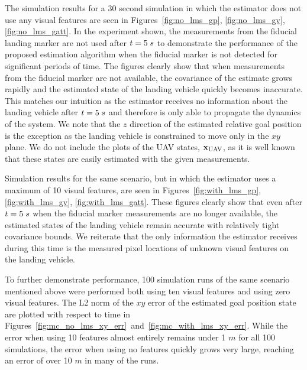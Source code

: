 The simulation results for a 30 second simulation in which the estimator does
not use any visual features are seen in
Figures~\ref{fig:no_lms_gp}, \ref{fig:no_lms_gv}, \ref{fig:no_lms_gatt}. In the
experiment shown, the measurements from the fiducial landing marker are not used
after $t = 5 \hphantom{\cdot} s$ to demonstrate the performance of the proposed
estimation algorithm when the fiducial marker is not detected for significant
periods of time. The figures clearly show that when measurements from the
fiducial marker are not available, the covariance of the estimate grows rapidly
and the estimated state of the landing vehicle quickly becomes inaccurate. This
matches our intuition as the estimator receives no information about the landing
vehicle after $t = 5 \hphantom{\cdot} s$ and therefore is only able to propagate
the dynamics of the system. We note that the $z$ direction of the estimated
relative goal position is the exception as the landing vehicle is constrained to
move only in the $xy$ plane. We do not include the plots of the UAV states,
$\boldsymbol{\mathrm{x}}_{\text{UAV}}$, as it is well known that these states are easily
estimated with the given measurements.

Simulation results for the same scenario, but in which the estimator uses a
maximum of 10 visual features, are seen in
Figures~\ref{fig:with_lms_gp}, \ref{fig:with_lms_gv}, \ref{fig:with_lms_gatt}.
These figures clearly show that even after $t = 5 \hphantom{\cdot} s$ when the
fiducial marker measurements are no longer available, the estimated states of
the landing vehicle remain accurate with relatively tight covariance bounds. We
reiterate that the only information the estimator receives during this time is
the measured pixel locations of unknown visual features on the landing vehicle.

To further demonstrate performance, 100 simulation runs of the same scenario
mentioned above were performed
both using ten visual features and using zero visual features. The L2 norm of
the $xy$ error of the estimated goal position state are plotted
with respect to time in
Figures~\ref{fig:mc_no_lms_xy_err}~and~\ref{fig:mc_with_lms_xy_err}. While the
error when using 10 features
almost entirely remains under 1 $m$ for all 100 simulations, the error when using
no features quickly grows very large, reaching an error of over 10 $m$ in many
of the runs.

